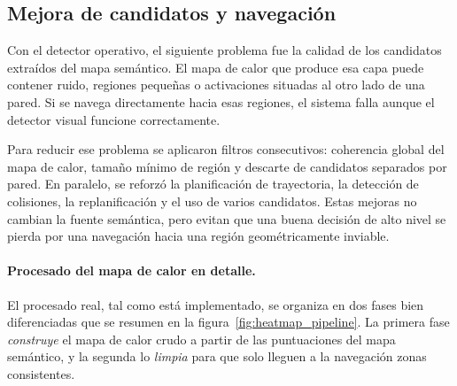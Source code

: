 \documentclass[11pt,fleqn,openany]{book} %
\begin{document}
\subsection*{Mejora de candidatos y navegación}

Con el detector operativo, el siguiente problema fue la calidad de los candidatos extraídos del mapa semántico. El mapa de calor que produce esa capa puede contener ruido, regiones pequeñas o activaciones situadas al otro lado de una pared. Si se navega directamente hacia esas regiones, el sistema falla aunque el detector visual funcione correctamente.

Para reducir ese problema se aplicaron filtros consecutivos: coherencia global del mapa de calor, tamaño mínimo de región y descarte de candidatos separados por pared. En paralelo, se reforzó la planificación de trayectoria, la detección de colisiones, la replanificación y el uso de varios candidatos. Estas mejoras no cambian la fuente semántica, pero evitan que una buena decisión de alto nivel se pierda por una navegación hacia una región geométricamente inviable.

\paragraph{Procesado del mapa de calor en detalle.} El procesado real, tal como está implementado, se organiza en dos fases bien diferenciadas que se resumen en la figura~\ref{fig:heatmap_pipeline}. La primera fase \emph{construye} el mapa de calor crudo a partir de las puntuaciones del mapa semántico, y la segunda lo \emph{limpia} para que solo lleguen a la navegación zonas consistentes.
\end{document}
